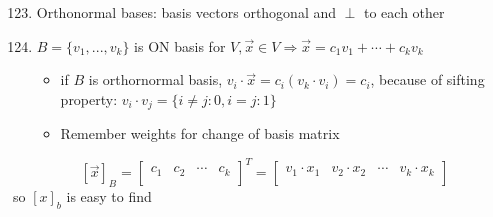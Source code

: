 \documentclass[10pt,letterpaper]{article}
\begin{document}
\begin{enumerate}
\setcounter{enumi}{122}
\item  Orthonormal bases: basis vectors orthogonal and $\perp$ to each other
\item $B = \{v _{1} ,...,v_k\}$ is ON basis for $V, \vec{x} \in V \Rightarrow \vec{x} = c _{1} v _{1} + \cdots + c _{k} v _{k}$

\begin{itemize}
\item if $B$ is orthornormal basis, $v_i \cdot \vec{x} = c_i (v_k \cdot v_i) = c_i$, because of sifting property: $v_i \cdot v_j= \{i \ne j: 0, i=j: 1\}$
\item Remember weights for change of basis matrix
\end{itemize}

\end{enumerate}
\[
[ \vec{x} ]_B = \begin{bmatrix}
c_1 & c_2 & \cdots & c_k \\
\end{bmatrix} ^{T} =
\begin{bmatrix}                                             
v_1 \cdot x_1 & v_2 \cdot x_2 & \cdots & v_k \cdot x_k \\ 
\end{bmatrix}
\]
    \hspace{1.2cm} \textbullet{} so $[x]_b$ is easy to find
\end{document}
